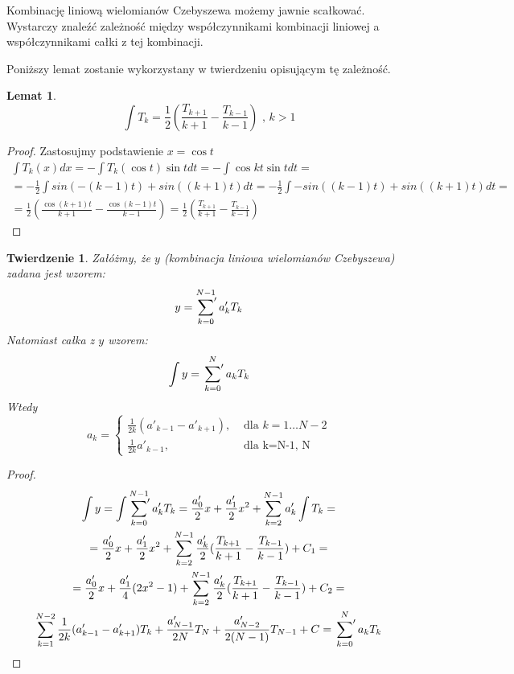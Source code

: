 \documentclass{article}
\newtheorem{theorem}{Twierdzenie}
\newtheorem{lemma}{Lemat}
\newcommand{\sumprim}[3] {
	\sideset{}{'}\sum_{#1}^{#2} #3
}
\begin{document}
\par Kombinację liniową wielomianów Czebyszewa możemy jawnie scałkować. Wystarczy znaleźć zależność między współczynnikami kombinacji liniowej a współczynnikami całki z tej kombinacji.

Poniższy lemat zostanie wykorzystany w twierdzeniu opisującym tę zależność.

\begin{lemma} 
	\label{le:chebint1}
	$$ \int T_k = \frac{1}{2}( \frac{ T_{k+1} }{ k+1 } - \frac{ T_{k-1} }{ k-1 } ) \text{ , $k > 1$}$$
\end{lemma}

\begin{proof}
	Zastosujmy podstawienie  $ x = \cos{t} $ 
	\begin{gather*}
		\int T_k(x) dx = - \int T_k(\cos{t}) \sin{t} dt = -\int \cos{kt}\sin{t} dt = \\
		= - \frac{1}{2} \int sin(-(k-1)t) + sin((k+1)t) dt  = - \frac{1}{2} \int -sin((k-1)t) + sin((k+1)t) dt = \\
	= \frac{1}{2} ( \frac{\cos{(k+1)t}}{k+1} - \frac{\cos{(k-1)t}}{k-1} ) = \frac{1}{2}( \frac{ T_{k+1} }{ k+1 } - \frac{ T_{k-1} }{ k-1 } )
	\end{gather*}
\end{proof}



\begin{theorem} 
	\label{th:chebint2}
	Załóżmy, że $y$ (kombinacja liniowa wielomianów Czebyszewa) zadana jest wzorem:
	$$ y = \sumprim{k=0}{N-1}{a'_k T_k} $$
	Natomiast całka z $y$ wzorem:
	$$ \int y = \sumprim{k=0}{N}{a_k T_k}$$ 
	Wtedy
	\begin{equation}
		\label{eq:chebint}
	 a_k = 
	 \begin{cases}
	 \frac{1}{2k} ( a'_{k-1} - a'_{k+1} ), & \text{ dla $k=1 \ldots N-2$} \\
	 \frac{1}{2k} a'_{k-1} , & \text{ dla k=N-1, N} 
	 \end{cases}
	\end{equation}
\end{theorem}

\begin{proof}
	\begin{gather*}
		\int y = \int \sumprim{k=0}{N-1}{a'_k T_k} = 
		\frac{a'_0}{2}x + \frac{a'_1}{2}x^2 + \sum_{k=2}^{N-1}a'_k \int T_k = \\
		 = \frac{a'_0}{2}x + \frac{a'_1}{2}x^2 + \sum_{k=2}^{N-1} \frac{a'_k}{2}( \frac{T_{k+1}}{k+1} - \frac{T_{k-1}}{k-1} ) + C_1 = \\	
		= \frac{a'_0}{2}x + \frac{a'_1}{4}(2x^2 - 1) + \sum_{k=2}^{N-1} \frac{a'_k}{2}( \frac{T_{k+1}}{k+1} - \frac{T_{k-1}}{k-1} ) + C_2 = \\
		\sum_{k=1}^{N-2} \frac{1}{2k}(a'_{k-1} - a'_{k+1}) T_k + \frac{a'_{N-1}}{2N} T_N + 
		\frac{ a'_{N-2} }{ 2(N-1) } T_{N-1} + C = \sumprim{k=0}{N}{a_k T_k}
	\end{gather*}
\end{proof}
\end{document}
